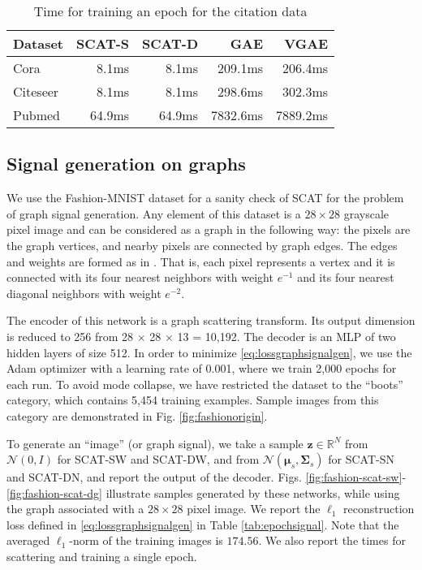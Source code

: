 \documentclass[conference]{IEEEtran}
\def\RR{\mathbb{R}}
\def\cN{\mathcal{N}}
\def\Bz{\boldsymbol{z}}
\def\Bmu{\boldsymbol{\mu}}
\def\BSigma{\boldsymbol{\Sigma}}
\begin{document}
\begin{table}[ht]
\caption{Time for training an epoch for the citation data}\label{tab:epochlink}
\centering
\begin{tabular}{lrrrr}
Dataset    &   SCAT-S    &    SCAT-D    &    GAE & VGAE    \\
\hline
Cora    &   8.1ms    &  8.1ms     &      209.1ms & 206.4ms      \\
Citeseer     &  8.1ms     &  8.1ms    &   298.6ms   & 302.3ms  \\
Pubmed    &  64.9ms     &  64.9ms     &  7832.6ms    &  7889.2ms   \\
\end{tabular}
\end{table}







\subsection{Signal generation on graphs}\label{subsec:graphsignalgen}


We use the Fashion-MNIST dataset \cite{xiao2017fashion} for a sanity check of SCAT for the problem of graph signal generation. 
Any element of this dataset is a $28 \times 28$ grayscale pixel image and can be considered as a graph in the following way: the pixels are the graph vertices, and nearby pixels are connected by graph edges. 
The edges and weights are formed as in \cite{zou2018graph}. That is, each pixel represents a vertex and it is connected with its four nearest neighbors with weight $e^{-1}$ and its four nearest diagonal neighbors with weight $e^{-2}$.

The encoder of this network is a graph scattering transform. Its output dimension is reduced to 256 from 28 $\times$ 28 $\times$ 13 = 10,192. The decoder is an MLP of two hidden layers of size 512. In order to minimize \eqref{eq:lossgraphsignalgen}, we use the Adam optimizer with a learning rate of 0.001, where we train 2,000 epochs for each run. {To avoid mode collapse,} we have restricted the dataset to the ``boots'' category, which contains 5,454 training examples. Sample images from this category are demonstrated in Fig. \ref{fig:fashionorigin}. 




To generate an ``image'' (or graph signal), we take a sample $\Bz \in \RR^N$ from $\cN(0,I)$ for SCAT-SW and SCAT-DW, and from $\cN(\Bmu_s, \BSigma_s)$ for SCAT-SN and SCAT-DN, and report the output of the decoder. 
Figs. \ref{fig:fashion-scat-sw}-\ref{fig:fashion-scat-dg} illustrate samples generated by these networks, while using the graph associated with a $28 \times 28$ pixel image. We report the $\ell_1$ reconstruction loss defined in \eqref{eq:lossgraphsignalgen} in Table \ref{tab:epochsignal}. Note that the averaged $\ell_1$-norm of the training images is $174.56$. We also report the times for scattering and training a single epoch. 
\end{document}
